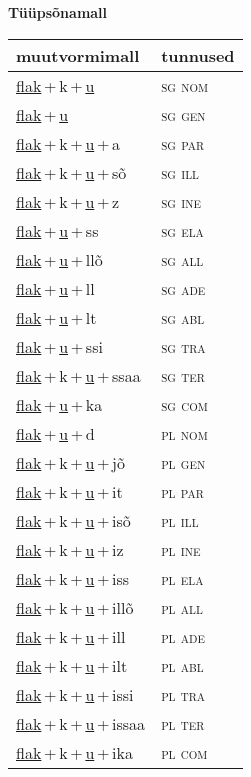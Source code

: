 
\vspace{1.8em}
\begin{minipage}{\textwidth}
\textbf{Tüüpsõnamall \,}\\

\begin{sideways}
\begin{tabular}{l l}
muutvormimall & tunnused \\
\hline
\underline{flak}\,+\,k\,+\,\underline{u} & \textsc{ sg nom } \\
\underline{flak}\,+\,\underline{u} & \textsc{ sg gen } \\
\underline{flak}\,+\,k\,+\,\underline{u}\,+\,a & \textsc{ sg par } \\
\underline{flak}\,+\,k\,+\,\underline{u}\,+\,sõ & \textsc{ sg ill } \\
\underline{flak}\,+\,k\,+\,\underline{u}\,+\,z & \textsc{ sg ine } \\
\underline{flak}\,+\,\underline{u}\,+\,ss & \textsc{ sg ela } \\
\underline{flak}\,+\,\underline{u}\,+\,llõ & \textsc{ sg all } \\
\underline{flak}\,+\,\underline{u}\,+\,ll & \textsc{ sg ade } \\
\underline{flak}\,+\,\underline{u}\,+\,lt & \textsc{ sg abl } \\
\underline{flak}\,+\,\underline{u}\,+\,ssi & \textsc{ sg tra } \\
\underline{flak}\,+\,k\,+\,\underline{u}\,+\,ssaa & \textsc{ sg ter } \\
\underline{flak}\,+\,\underline{u}\,+\,ka & \textsc{ sg com } \\
\underline{flak}\,+\,\underline{u}\,+\,d & \textsc{ pl nom } \\
\underline{flak}\,+\,k\,+\,\underline{u}\,+\,jõ & \textsc{ pl gen } \\
\underline{flak}\,+\,k\,+\,\underline{u}\,+\,it & \textsc{ pl par } \\
\underline{flak}\,+\,k\,+\,\underline{u}\,+\,isõ & \textsc{ pl ill } \\
\underline{flak}\,+\,k\,+\,\underline{u}\,+\,iz & \textsc{ pl ine } \\
\underline{flak}\,+\,k\,+\,\underline{u}\,+\,iss & \textsc{ pl ela } \\
\underline{flak}\,+\,k\,+\,\underline{u}\,+\,illõ & \textsc{ pl all } \\
\underline{flak}\,+\,k\,+\,\underline{u}\,+\,ill & \textsc{ pl ade } \\
\underline{flak}\,+\,k\,+\,\underline{u}\,+\,ilt & \textsc{ pl abl } \\
\underline{flak}\,+\,k\,+\,\underline{u}\,+\,issi & \textsc{ pl tra } \\
\underline{flak}\,+\,k\,+\,\underline{u}\,+\,issaa & \textsc{ pl ter } \\
\underline{flak}\,+\,k\,+\,\underline{u}\,+\,ika & \textsc{ pl com } \\
\end{tabular}
\end{sideways}
\label{tab:tüüpsõnamall-flakku}


\end{minipage}

